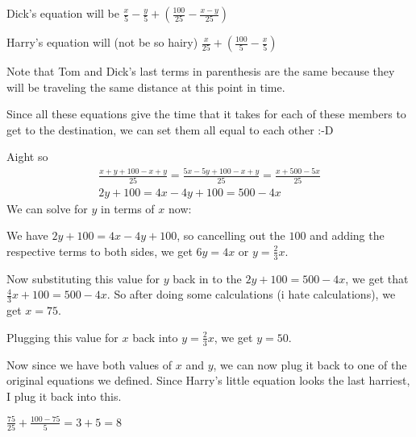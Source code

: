 \documentclass[../mathproblems.tex]{subfiles}
\begin{document}
Dick's equation will be $\frac{x}{5}-\frac{y}{5} + \left(\frac{100}{25}-\frac{x-y}{25}\right)$

Harry's equation will (not be so hairy) $\frac{x}{25}+\left(\frac{100}{5}-\frac{x}{5}\right)$

Note that Tom and Dick's last terms in parenthesis are the same because they will be traveling the same distance at this point in time.

Since all these equations give the time that it takes for each of these members to get to the destination, we can set them all equal to each other :-D

Aight so
\begin{align*} \frac{x+y+100-x+y}{25}=\frac{5x-5y+100-x+y}{25}=\frac{x+500-5x}{25}\\ 2y+100=4x-4y+100=500-4x \end{align*}We can solve for $y$ in terms of $x$ now:

We have $2y+100=4x-4y+100$, so cancelling out the $100$ and adding the respective terms to both sides, we get $6y=4x$ or $y=\frac{2}{3}x$.

Now substituting this value for $y$ back in to the $2y+100=500-4x$, we get that $\frac{4}{3}x+100=500-4x$. So after doing some calculations (i hate calculations), we get $x=75$.

Plugging this value for $x$ back into $y=\frac{2}{3}x$, we get $y=50$.

Now since we have both values of $x$ and $y$, we can now plug it back to one of the original equations we defined. Since Harry's little equation looks the last harriest, I plug it back into this.

$\frac{75}{25}+\frac{100-75}{5}=3+5 = \boxed{8}$

\noindent\hrulefill
\end{document}
